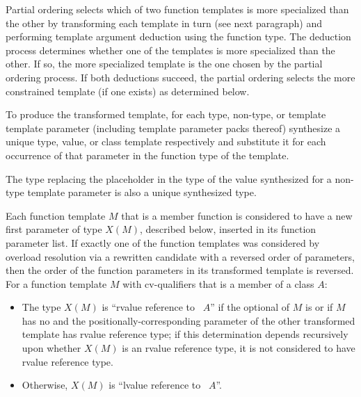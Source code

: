 \pnum
Partial ordering selects which of two function templates is more
specialized than the other by transforming each template in turn
(see next paragraph) and performing template argument deduction
using the function type.
The deduction process determines whether
one of the templates is more specialized than the other. If so, the
more specialized template is the one chosen by the partial ordering
process.
If both deductions succeed, the partial ordering selects
the more constrained template (if one exists) as determined below.

\pnum
To produce the transformed template, for each type, non-type, or template
template parameter (including template parameter packs
thereof) synthesize a unique type, value, or class template
respectively and substitute it for each occurrence of that parameter
in the function type of the template.
\begin{note}
The type replacing the placeholder
in the type of the value synthesized for a non-type template parameter
is also a unique synthesized type.
\end{note}
Each function template $M$ that is a member function
is considered to have
a new first parameter of type $X(M)$, described below,
inserted in its function parameter list.
If exactly one of the function templates was considered by overload resolution
via a rewritten candidate
with a reversed order of parameters,
then the order of the function parameters in its transformed template
is reversed.
For a function template $M$ with cv-qualifiers \cv{}
that is a member of a class $A$:

\begin{itemize}
\item
The type $X(M)$ is ``rvalue reference to \cv{}~$A$''
if the optional  of
$M$ is \tcode{\&\&} or
if $M$ has no  and
the positionally-corresponding parameter of the other transformed template
has rvalue reference type;
if this determination depends recursively upon
whether $X(M)$ is an rvalue reference type,
it is not considered to have rvalue reference type.

\item
Otherwise, $X(M)$ is ``lvalue reference to \cv{}~$A$''.
\end{itemize}


